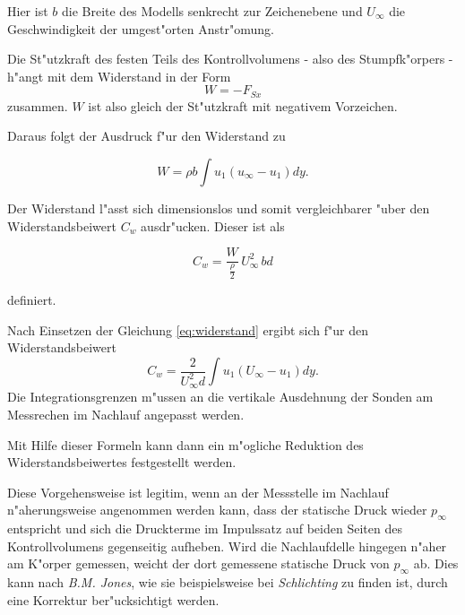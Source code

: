 Hier ist $b$ die Breite des Modells senkrecht zur Zeichenebene und $U_{\infty}$ die Geschwindigkeit der umgest"orten Anstr"omung.

Die St"utzkraft des festen Teils des Kontrollvolumens - also des Stumpfk"orpers - h"angt mit dem Widerstand in der Form
	\begin{equation}
	\label{eq:W=-F_Sx}
		W = - F_{Sx}
	\end{equation}
zusammen. 
$W$ ist also gleich der St"utzkraft mit negativem Vorzeichen.

Daraus folgt der Ausdruck f"ur den Widerstand zu
	\begin{center}
	\begin{equation}
	\label{eq:widerstand}
		W = \rho b \int u_{1} (u_{\infty}- u_{1}) dy.
	\end{equation}
	\end{center}

Der Widerstand l"asst sich dimensionslos und somit vergleichbarer "uber den Widerstandsbeiwert $C_w$ ausdr"ucken. Dieser ist als 
	\begin{center}
	\begin{equation}
	\label{eq:def-c_w}
		C_w = \frac{W}{\frac{\rho}{2}}\, U_{\infty}^2 \, bd
	\end{equation}
	\end{center}
definiert.

Nach Einsetzen der Gleichung \ref{eq:widerstand} ergibt sich f"ur den Widerstandsbeiwert
	\begin{equation}
	\label{eq:Bestimmungsgleichung C_w}
		C_w = \frac{2}{U_{\infty}^2 d} \int u_{1}(U_{\infty} - u_{1}) dy.
	\end{equation}
Die Integrationsgrenzen m"ussen an die vertikale Ausdehnung der Sonden am Messrechen im Nachlauf angepasst werden.	

Mit Hilfe dieser Formeln kann dann ein m"ogliche Reduktion des Widerstandsbeiwertes festgestellt werden.

Diese Vorgehensweise ist legitim, wenn an der Messstelle im Nachlauf n"aherungsweise angenommen werden kann, dass der statische Druck wieder $p_\infty$ entspricht und sich die Druckterme im Impulssatz auf  beiden Seiten des Kontrollvolumens gegenseitig aufheben.
Wird die Nachlaufdelle hingegen n"aher am K"orper gemessen, weicht der dort gemessene statische Druck von $p_{\infty}$ ab. Dies  kann nach \textit{B.M. Jones}, wie sie beispielsweise bei \textit{Schlichting}\cite{Schlichting.2011} zu finden ist, durch eine Korrektur ber"ucksichtigt werden.

